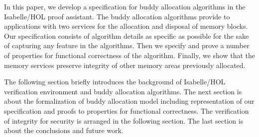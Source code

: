 In this paper, we develop a specification for buddy allocation algorithms in the Isabelle/HOL proof assistant. The buddy allocation algorithms provide to applications with two services for the allocation and disposal of memory blocks. Our specification consists of algorithm details as specific as possible for the sake of capturing any feature in the algorithms. Then we specify and prove a number of properties for functional correctness of the algorithm. Finally, we show that the memory services preserve integrity of other memory areas previously allocated.

The following section briefly introduces the background of Isabelle/HOL verification environment and buddy allocation algorithms. The next section is about the formalization of buddy allocation model including representation of our specification and proofs to properties for functional correctness. The verification of integrity for security is arranged in the following section. The last section is about the conclusions and future work.


